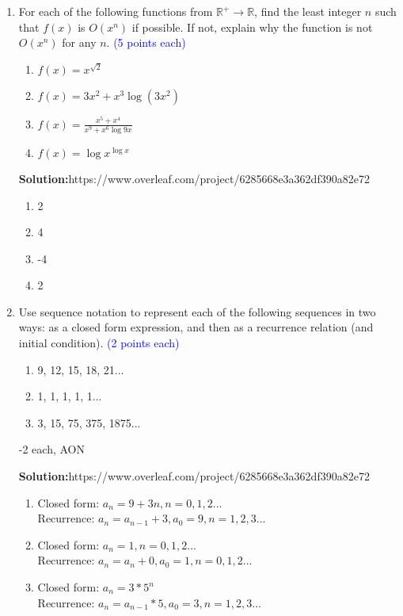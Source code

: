 \documentclass{article}
\newcommand{\pte}[1]{\textcolor{blue}{(#1 points each)}}
\newenvironment{solution}
{
\par
\color{blue}
\textbf{Solution:}https://www.overleaf.com/project/6285668e3a362df390a82e72
}
{
\par
}
\newenvironment{rubric}
{
\par
\begin{spacing}{.6}
\begin{itshape}
\color{red}

}
{
\end{itshape}
\end{spacing}
\par
}
\begin{document}
\begin{enumerate}
\begin{solution}
    (a) Onto and one-to-one,  \rightarrow {}\\
    (b)\ Neither,  \rightarrow {}

\end{solution}

\item For each of the following functions from $\mathbb{R}^+ \rightarrow \mathbb{R}$, find the least integer $n$ such that $f(x)$ is $O(x^n)$ if possible. If not, explain why the function is not $O(x^n)$ for any $n$. \pte{5}

\begin{enumerate}
    \item $f(x) = x^{\sqrt{2}}$
    \item $f(x) = 3x^2 + x^3\log(3x^2)$
    \item $f(x) = \frac{x^5 + x^4}{x^9 + x^6\log9x}$
    \item $f(x) = \log x^{\log x}$
\end{enumerate}

\begin{solution}
\begin{enumerate}
    \item 2
    \item 4
    \item -4
    \item 2
\end{enumerate}
\end{solution}

\item Use sequence notation to represent each of the following sequences in two ways: as a closed form expression, and then as a recurrence relation (and initial condition). \pte{2}

\begin{enumerate}
    \item 9, 12, 15, 18, 21...
    \item 1, 1, 1, 1, 1...
    \item 3, 15, 75, 375, 1875...
\end{enumerate}

\begin{rubric}
    -2 each, AON
\end{rubric}

\begin{solution}
\begin{enumerate}
    \item Closed form: $a_{n}=9+3n, n=0,1,2...$\\ Recurrence: $a_{n}=a_{n-1}+3, a_{0}=9, n=1,2,3...$
    \item Closed form: $a_{n} = 1, n=0,1,2...$\\ Recurrence: $a_{n}=a_{n}+0, a_{0}=1,n=0,1,2...$
    \item Closed form: $a_{n}=3*5^{n}$\\ Recurrence: $a_{n}=a_{n-1}*5, a_{0}=3, n=1,2,3...$
\end{enumerate}
\end{solution}


\end{enumerate}
\end{document}
